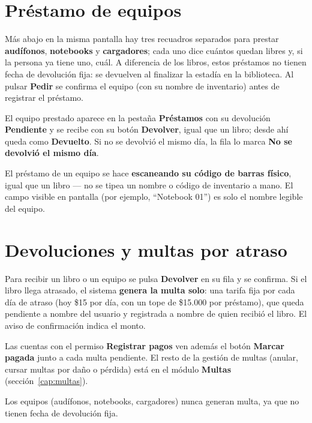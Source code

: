 \documentclass[11pt,a4paper]{report}
\begin{document}

\section{Préstamo de equipos}

Más abajo en la misma pantalla hay tres recuadros separados para prestar
\textbf{audífonos}, \textbf{notebooks} y \textbf{cargadores}; cada uno dice
cuántos quedan libres y, si la persona ya tiene uno, cuál. A diferencia de
los libros, estos préstamos no tienen fecha de devolución fija: se
devuelven al finalizar la estadía en la biblioteca. Al pulsar
\textbf{Pedir} se confirma el equipo (con su nombre de inventario) antes
de registrar el préstamo.

El equipo prestado aparece en la pestaña \textbf{Préstamos} con su
devolución \textbf{Pendiente} y se recibe con su botón \textbf{Devolver},
igual que un libro; desde ahí queda como \textbf{Devuelto}. Si no se
devolvió el mismo día, la fila lo marca \textbf{No se devolvió el mismo
día}.

\begin{nota}
El préstamo de un equipo se hace \textbf{escaneando su código de
barras físico}, igual que un libro --- no se tipea un nombre o código de
inventario a mano. El campo visible en pantalla (por ejemplo,
``Notebook 01'') es solo el nombre legible del equipo.
\end{nota}

\section{Devoluciones y multas por atraso}

Para recibir un libro o un equipo se pulsa \textbf{Devolver} en su fila y
se confirma.
Si el libro llega atrasado, el sistema \textbf{genera la multa solo}: una
tarifa fija por cada día de atraso (hoy \$15 por día, con un tope de
\$15.000 por préstamo), que queda pendiente a nombre del usuario y
registrada a nombre de quien recibió el libro. El aviso de confirmación
indica el monto.

Las cuentas con el permiso \textbf{Registrar pagos} ven además el botón
\textbf{Marcar pagada} junto a cada multa pendiente. El resto de la
gestión de multas (anular, cursar multas por daño o pérdida) está en el
módulo \textbf{Multas} (sección~\ref{cap:multas}).

\begin{nota}
Los equipos (audífonos, notebooks, cargadores) nunca generan multa, ya
que no tienen fecha de devolución fija.
\end{nota}
\end{document}
